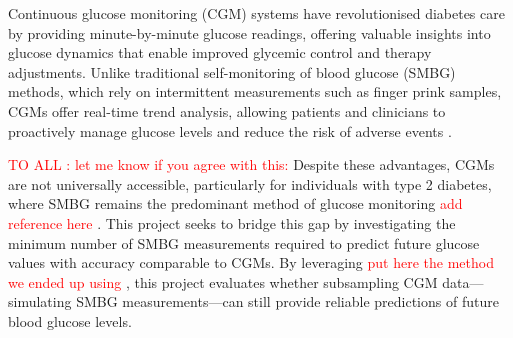 \begin{comment}
Artificial intelligence can be used to support many aspects of diabetes care such as assessing risk of developing the disease, diagnosis, lifestyle recommendations among others \cite{mayya_need_2024}. Of interest in this study is the use of artificial intelligence, and so called data-driven methods, in the prediction of blood glucose levels. This subsequently raises the question, given if it is possible to predict future glucose values, what is the prediction horizon, or how far into the future can this prediction still be accurate. Addressing this question is impactful as it could allow for patients using only single finger sticks to have an idea of what their continuous glucose would be or could notify patients using continuous glucose monitoring that they need to take corrective action to avoid an adverse glycemic event.
\end{comment}

Continuous glucose monitoring (CGM) systems have revolutionised diabetes care by providing minute-by-minute glucose readings, offering valuable insights into glucose dynamics that enable improved glycemic control and therapy adjustments. Unlike traditional self-monitoring of blood glucose (SMBG) methods, which rely on intermittent measurements such as finger prink samples, CGMs offer real-time trend analysis, allowing patients and clinicians to proactively manage glucose levels and reduce the risk of adverse events \cite{Heinemann2018, Beck2017, Battelino2019}.

\textcolor{red}{TO ALL : let me know if you agree with this: }
Despite these advantages, CGMs are not universally accessible, particularly for individuals with type 2 diabetes, where SMBG remains the predominant method of glucose monitoring\textcolor{red}{ add reference here }. This project seeks to bridge this gap by investigating the minimum number of SMBG measurements required to predict future glucose values with accuracy comparable to CGMs. By leveraging \textcolor{red}{put here the method we ended up using }, this project evaluates whether subsampling CGM data—simulating SMBG measurements—can still provide reliable predictions of future blood glucose levels. 

